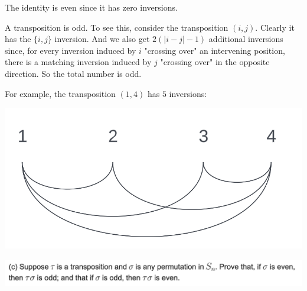 The identity is even since it has zero inversions.

A transposition is odd. To see this, consider the transposition $(i, j)$. Clearly it has
the $\{i, j\}$ inversion. And we also get $2(|i - j| - 1)$ additional inversions since, for every
inversion induced by $i$ "crossing over" an intervening position, there is a matching inversion
induced by $j$ "crossing over" in the opposite direction. So the total number is odd.

For example, the transposition $(1, 4)$ has $5$ inversions:
\begin{mdframed}
\includegraphics[width=400pt]{img/abstract-algebra--nf--2-e92f.png}
\end{mdframed}




\begin{mdframed}
\includegraphics[width=400pt]{img/algebra--nf--2-179c.png}
\end{mdframed}

